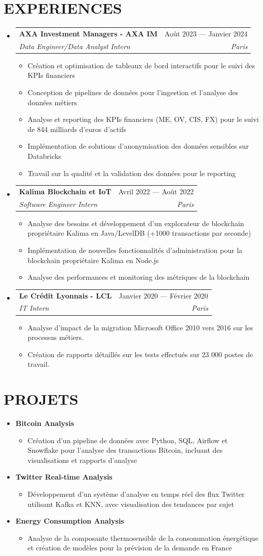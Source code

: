\documentclass[11pt,a4paper]{article}
\makeatletter
\newcommand{\resumeItem}[1]{
  \item\footnotesize{
    {#1 \vspace{-1pt}}
  }
}
\newcommand{\resumeSubheading}[4]{
  \vspace{2pt}\item
    \begin{tabular*}{\textwidth}[t]{l@{\extracolsep{\fill}}r}
      {\footnotesize\textbf{#1}} & {\footnotesize#2} \\
      {\footnotesize\textit{#3}} & {\footnotesize\textit{#4}} \\
    \end{tabular*}\vspace{2pt}
}
\newcommand{\resumeProjectHeading}[2]{
  \item
  {\footnotesize#1} \hfill {#2}
}
\newcommand{\resumeSubHeadingListStart}{\begin{itemize}[leftmargin=0in, label={}]}
\newcommand{\resumeSubHeadingListEnd}{\end{itemize}}
\newcommand{\resumeItemListStart}{\begin{itemize}[label={\textbullet}]}
\newcommand{\resumeItemListEnd}{\end{itemize}\vspace{0pt}}
\makeatother
\begin{document}
\section{EXPERIENCES}
\resumeSubHeadingListStart
    \resumeSubheading
      {AXA Investment Managers - AXA IM}{Août 2023 --- Janvier 2024}
      {Data Engineer/Data Analyst Intern}{Paris}
      \resumeItemListStart
        \resumeItem{Création et optimisation de tableaux de bord interactifs pour le suivi des KPIs financiers}
        \resumeItem{Conception de pipelines de données pour l'ingestion et l'analyse des données métiers}
        \resumeItem{Analyse et reporting des KPIs financiers (ME, OV, CIS, FX) pour le suivi de 844 milliards d'euros d'actifs}
        \resumeItem{Implémentation de solutions d'anonymisation des données sensibles sur Databricks}
        \resumeItem{Travail sur la qualité et la validation des données pour le reporting}
      \resumeItemListEnd
    \resumeSubheading
      {Kalima Blockchain et IoT}{Avril 2022 --- Août 2022}
      {Software Engineer Intern}{Paris}
      \resumeItemListStart
        \resumeItem{Analyse des besoins et développement d'un explorateur de blockchain propriétaire Kalima en Java/LevelDB (+1000 transactions par seconde)}
        \resumeItem{Implémentation de nouvelles fonctionnalités d'administration pour la blockchain propriétaire Kalima en Node.js}
        \resumeItem{Analyse des performances et monitoring des métriques de la blockchain}
      \resumeItemListEnd
    \resumeSubheading
      {Le Crédit Lyonnais - LCL}{Janvier 2020 --- Février 2020}
      {IT Intern}{Paris}
      \resumeItemListStart
        \resumeItem{Analyse d'impact de la migration Microsoft Office 2010 vers 2016 sur les processus métiers.}
        \resumeItem{Création de rapports détaillés sur les tests effectués sur 23 000 postes de travail.}
      \resumeItemListEnd
  \resumeSubHeadingListEnd

\section{PROJETS}
\resumeSubHeadingListStart
    \resumeProjectHeading
      {\textbf{Bitcoin Analysis}} {}
      \resumeItemListStart
        \resumeItem{Création d'un pipeline de données avec Python, SQL, Airflow et Snowflake pour l'analyse des transactions Bitcoin, incluant des visualisations et rapports d'analyse}
      \resumeItemListEnd
    \resumeProjectHeading
      {\textbf{Twitter Real-time Analysis}} {}
      \resumeItemListStart
        \resumeItem{Développement d'un système d'analyse en temps réel des flux Twitter utilisant Kafka et KNN, avec visualisation des tendances par sujet}
      \resumeItemListEnd
    \resumeProjectHeading
      {\textbf{Energy Consumption Analysis \@Capgemini}} {}
      \resumeItemListStart
        \resumeItem{Analyse de la composante thermosensible de la consommation énergétique et création de modèles pour la prévision de la demande en France}
      \resumeItemListEnd
\resumeSubHeadingListEnd
\end{document}
